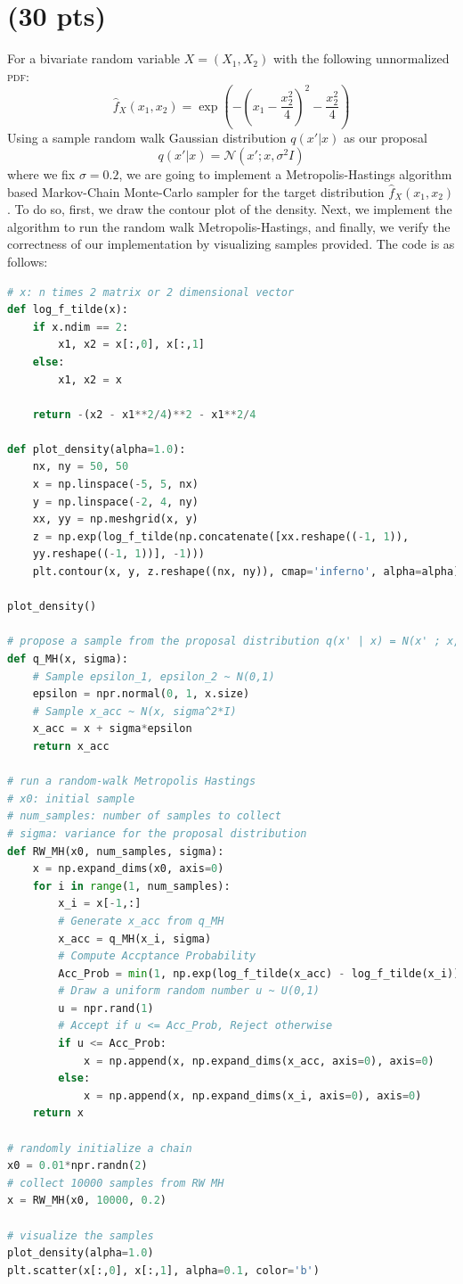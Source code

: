 \section{ (30 pts)}
For a bivariate random variable $X = (X_1, X_2)$ with the following unnormalized \textsc{pdf}:
\begin{equation*}
	\hat{f}_X(x_1, x_2) = \exp \left(-\left(x_1 - \frac{x_2^2}{4}\right)^2 - \frac{x_2^2}{4}\right)
\end{equation*}
Using a sample random walk Gaussian distribution $q(x'|x)$ as our proposal
\begin{equation*}
	q(x'|x) = \mathcal{N}(x';x,\sigma^2 I)
\end{equation*}
where we fix $\sigma = 0.2$, we are going to implement a Metropolis-Hastings algorithm based Markov-Chain Monte-Carlo sampler for the target distribution $\hat{f}_X(x_1,x_2)$. 
To do so, first, we draw the contour plot of the density. 
Next, we implement the algorithm to run the random walk Metropolis-Hastings, and finally, we verify the correctness of our implementation by visualizing samples provided.
The code is as follows:
\begin{lstlisting}[language=Python]
# x: n times 2 matrix or 2 dimensional vector
def log_f_tilde(x):
	if x.ndim == 2:
		x1, x2 = x[:,0], x[:,1]
	else:
		x1, x2 = x

	return -(x2 - x1**2/4)**2 - x1**2/4

def plot_density(alpha=1.0):
	nx, ny = 50, 50
	x = np.linspace(-5, 5, nx)
	y = np.linspace(-2, 4, ny)
	xx, yy = np.meshgrid(x, y)
	z = np.exp(log_f_tilde(np.concatenate([xx.reshape((-1, 1)), 
	yy.reshape((-1, 1))], -1)))
	plt.contour(x, y, z.reshape((nx, ny)), cmap='inferno', alpha=alpha)

plot_density()

# propose a sample from the proposal distribution q(x' | x) = N(x' ; x, sigma^2*I)
def q_MH(x, sigma):
	# Sample epsilon_1, epsilon_2 ~ N(0,1)
	epsilon = npr.normal(0, 1, x.size)
	# Sample x_acc ~ N(x, sigma^2*I)
	x_acc = x + sigma*epsilon
	return x_acc

# run a random-walk Metropolis Hastings
# x0: initial sample
# num_samples: number of samples to collect
# sigma: variance for the proposal distribution
def RW_MH(x0, num_samples, sigma):
	x = np.expand_dims(x0, axis=0)
	for i in range(1, num_samples):
		x_i = x[-1,:]
		# Generate x_acc from q_MH
		x_acc = q_MH(x_i, sigma)
		# Compute Accptance Probability
		Acc_Prob = min(1, np.exp(log_f_tilde(x_acc) - log_f_tilde(x_i)))
		# Draw a uniform random number u ~ U(0,1)
		u = npr.rand(1)
		# Accept if u <= Acc_Prob, Reject otherwise
		if u <= Acc_Prob: 
			x = np.append(x, np.expand_dims(x_acc, axis=0), axis=0)
		else: 
			x = np.append(x, np.expand_dims(x_i, axis=0), axis=0)
	return x

# randomly initialize a chain
x0 = 0.01*npr.randn(2)
# collect 10000 samples from RW MH
x = RW_MH(x0, 10000, 0.2)

# visualize the samples
plot_density(alpha=1.0)
plt.scatter(x[:,0], x[:,1], alpha=0.1, color='b')
\end{lstlisting}
